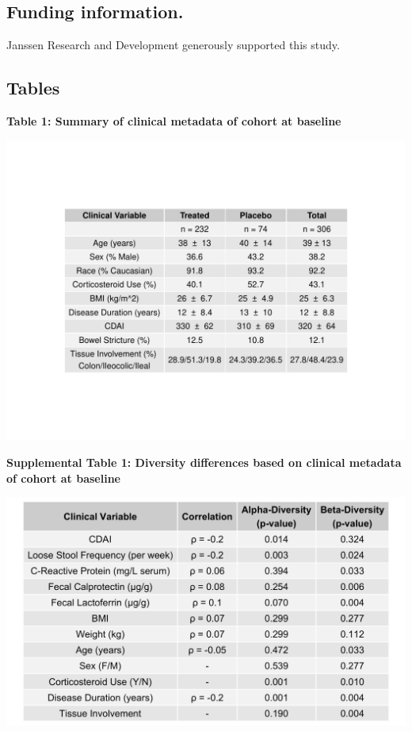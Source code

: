 \documentclass[12pt,]{article}
\begin{document}
\subsection{Funding information.}\label{funding-information.}

Janssen Research and Development generously supported this study.

\newpage

\subsection{Tables}\label{tables}

\textbf{Table 1: Summary of clinical metadata of cohort at baseline}

\includegraphics{tables/Table1_baseline_metadata.pdf}

\newpage

\textbf{Supplemental Table 1: Diversity differences based on clinical
metadata of cohort at baseline}

\includegraphics{tables/Supp.table1_cohortdiversity.pdf}
\end{document}
